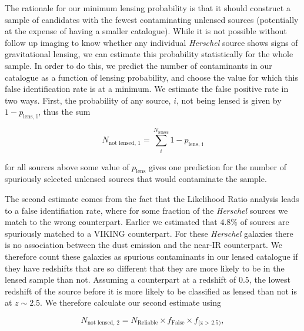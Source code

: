 The rationale for our minimum lensing probability is that it should construct a sample of candidates with the fewest contaminating unlensed sources (potentially at the expense of having a smaller catalogue). While it is not possible without follow up imaging to know whether any individual \textit{Herschel} source shows signs of gravitational lensing, we can estimate this probability statistically for the whole sample. In order to do this, we predict the number of contaminants in our catalogue as a function of lensing probability, and choose the value for which this false identification rate is at a minimum. We estimate the false positive rate in two ways. First, the probability of any source, $i$, not being lensed is given by $1 - p_{\textrm{lens, i}}$, thus the sum 

\begin{equation}
N_{\textrm{not lensed, 1}} = \sum_{i}^{N_{\textrm{lenses}}}{1 - p_{\textrm{lens, i}}}
\label{eq:unlensed_estimate_1}
\end{equation} 

\noindent for all sources above some value of $p_{\textrm{lens}}$ gives one prediction for the number of spuriously selected unlensed sources that would contaminate the sample.

The second estimate comes from the fact that the Likelihood Ratio analysis leads to a false identifiation rate, where for some fraction of the \textit{Herschel} sources we match to the wrong counterpart. Earlier we estimated that $4.8\%$ of sources are spuriously matched to a VIKING counterpart. For these \textit{Herschel} galaxies there is no association between the dust emission and the near-IR counterpart. We therefore count these galaxies as spurious contaminants in our lensed catalogue if they have redshifts that are so different that they are more likely to be in the lensed sample than not. Assuming a counterpart at a redshift of $0.5$, the lowest redshift of the source before it is more likely to be classified as lensed than not is at $z \sim 2.5$. We therefore calculate our second estimate using

\begin{equation}
N_{\textrm{not lensed, 2}} = N_{\textrm{Reliable}} \times f_{\textrm{False}} \times f_{\textrm{(z > 2.5)}},
\end{equation} 

